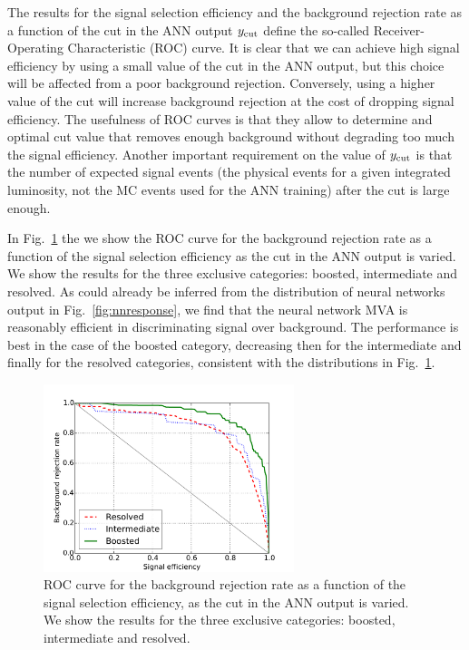 The results for the signal selection efficiency and the 
background rejection rate as a function of the cut in the ANN output
$y_{\rm cut}$
define the so-called  Receiver-Operating Characteristic (ROC)
curve.
%
It is clear that we can achieve  high signal efficiency by using
a small value of the cut in the ANN output, but this choice will be
affected from a poor background
rejection.
%
Conversely, using a higher value of the cut will increase background rejection at the
cost of dropping signal efficiency.
%
The usefulness of ROC curves is that they allow to determine and
optimal cut value that removes enough background without degrading too much the signal efficiency.
%
Another important requirement on the value of $y_{\rm cut}$ is that
the  number of expected  signal events (the physical
events for a given integrated
luminosity, not the MC events used for the ANN training)
after the cut is large enough.


In Fig.~\ref{fig:exampleroc} the
we show the ROC curve for the background rejection rate as a function of the signal
  selection efficiency as the cut in the ANN output is varied.
  We show the results for the three exclusive categories: boosted, intermediate
  and resolved.
%
As could already be inferred from the distribution of neural
networks output in Fig.~\ref{fig:nnresponse}, we find
that the neural network MVA is reasonably efficient
in discriminating signal over background.
%
The performance is best in the case of the boosted category,
decreasing then for the intermediate and finally for the
resolved categories, consistent with the distributions in
Fig.~\ref{fig:exampleroc}.
%



\begin{figure}[t]
\begin{center}
\includegraphics[width=0.65\textwidth]{plots/roc.pdf}
\caption{\small ROC curve for the background rejection rate as a function of the signal
  selection efficiency, as the cut in the ANN output is varied.
  We show the results for the three exclusive categories: boosted, intermediate
  and resolved.
}
\label{fig:exampleroc}
\end{center}
\end{figure}

